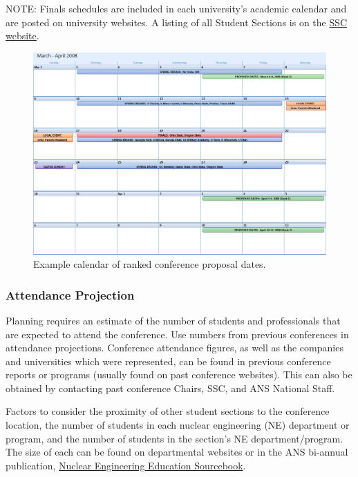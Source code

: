 \documentclass[12pt]{article}
\begin{document}
NOTE: Finals schedules are included in each university's academic calendar and are posted on university websites. A listing of all Student Sections is on the \href{http://students.ans.org}{SSC website}.

\begin{figure}[h]
\centering
\includegraphics[width=16cm]{conference_dates.png}
\caption{Example calendar of ranked conference proposal dates.}
\label{fig:conference_dates}
\end{figure}

\subsubsection{Attendance Projection}
Planning requires an estimate of the number of students and professionals that are expected to attend the conference. Use numbers from previous conferences in attendance projections. Conference attendance figures, as well as the companies and universities which were represented, can be found in previous conference reports or programs (usually found on past conference websites). This can also be obtained by contacting past conference Chairs, SSC, and ANS National Staff.

Factors to consider the proximity of other student sections to the conference location, the number of students in each nuclear engineering (NE) department or program, and the number of students in the section's NE department/program. The size of each can be found on departmental websites or in the ANS bi-annual publication, \href{https://www.energy.gov/ne/downloads/nuclear-science-and-engineering-education-sourcebook}{Nuclear Engineering Education Sourcebook}.
\end{document}

